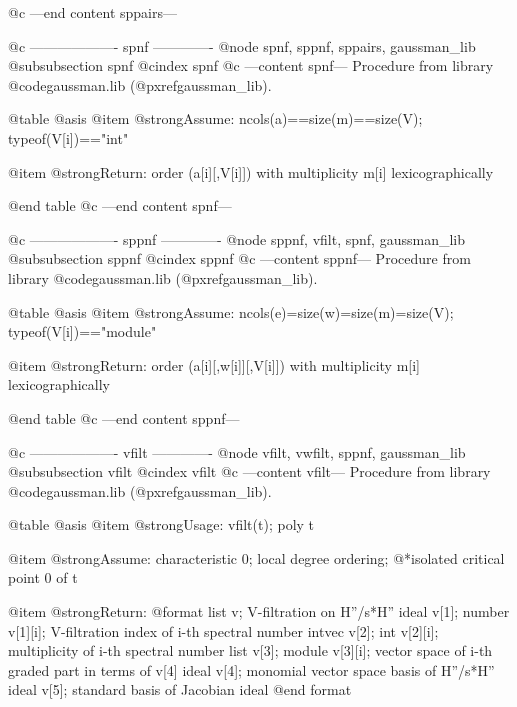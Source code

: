 @c ---end content sppairs---

@c ------------------- spnf -------------
@node spnf, sppnf, sppairs, gaussman_lib
@subsubsection spnf
@cindex spnf
@c ---content spnf---
Procedure from library @code{gaussman.lib} (@pxref{gaussman_lib}).

@table @asis
@item @strong{Assume:}
ncols(a)==size(m)==size(V); typeof(V[i])=="int"

@item @strong{Return:}
order (a[i][,V[i]]) with multiplicity m[i] lexicographically

@end table
@c ---end content spnf---

@c ------------------- sppnf -------------
@node sppnf, vfilt, spnf, gaussman_lib
@subsubsection sppnf
@cindex sppnf
@c ---content sppnf---
Procedure from library @code{gaussman.lib} (@pxref{gaussman_lib}).

@table @asis
@item @strong{Assume:}
ncols(e)=size(w)=size(m)=size(V); typeof(V[i])=="module"

@item @strong{Return:}
order (a[i][,w[i]][,V[i]]) with multiplicity m[i] lexicographically

@end table
@c ---end content sppnf---

@c ------------------- vfilt -------------
@node vfilt, vwfilt, sppnf, gaussman_lib
@subsubsection vfilt
@cindex vfilt
@c ---content vfilt---
Procedure from library @code{gaussman.lib} (@pxref{gaussman_lib}).

@table @asis
@item @strong{Usage:}
vfilt(t); poly t

@item @strong{Assume:}
characteristic 0; local degree ordering;
@*isolated critical point 0 of t

@item @strong{Return:}
@format
list v;  V-filtration on H''/s*H''
  ideal v[1];
    number v[1][i];  V-filtration index of i-th spectral number
  intvec v[2];
    int v[2][i];  multiplicity of i-th spectral number
  list v[3];
    module v[3][i];  vector space of i-th graded part in terms of v[4]
  ideal v[4];  monomial vector space basis of H''/s*H''
  ideal v[5];  standard basis of Jacobian ideal
@end format

